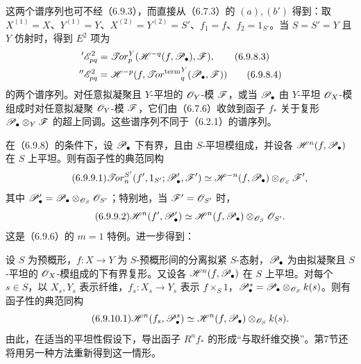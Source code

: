 这两个谱序列也可不经（6.9.3），而直接从（6.7.3）的 $(a),(b')$ 得到：取 $X^{(1)}=X$、$Y^{(1)}=Y$、$X^{(2)}=Y^{(2)}=S'$、$f_1=f$、$f_2=1_{S'}$。当 $S=S'=Y$ 且 $Y$ 仿射时，得到 $E^2$ 项为
\begin{align}
 {}'\mathscr E^2_{pq}&=\mathscr{T}\!or_p^Y(\mathscr H^{-q}(f,\mathscr P_\bullet),\mathscr F),\tag{6.9.8.3}\\
 {}''\mathscr E^2_{pq}&=\mathscr H^{-p}(f,\mathop{\mathscr{T}\!or^{\mathrm{term}}}\nolimits_q^Y(\mathscr P_\bullet,\mathscr F))\tag{6.9.8.4}
\end{align}
的两个谱序列。对任意拟凝聚且 $Y$-平坦的 $\mathscr O_Y$-模 $\mathscr F$，或当 $\mathscr P_\bullet$ 由 $Y$-平坦 $\mathscr O_X$-模组成时对任意拟凝聚 $\mathscr O_Y$-模 $\mathscr F$，它们由（6.7.6）收敛到函子 $f_*$ 关于复形 $\mathscr P_\bullet\otimes_Y\mathscr F$ 的超上同调。这些谱序列不同于（6.2.1）的谱序列。

在（6.9.8）的条件下，设 $\mathscr P_\bullet$ 下有界，且由 $S$-平坦模组成，并设各 $\mathscr H^n(f,\mathscr P_\bullet)$ 在 $S$ 上平坦。则有函子性的典范同构
\begin{equation}\tag{6.9.9.1}
 \mathscr{T}\!or_n^{S'}(f',1_{S'};\mathscr P'_\bullet,\mathscr F')
 \simeq\mathscr H^{-n}(f,\mathscr P_\bullet)\otimes_{\mathscr O_S}\mathscr F',
\end{equation}
其中 $\mathscr P'_\bullet=\mathscr P_\bullet\otimes_{\mathscr O_S}\mathscr O_{S'}$；特别地，当 $\mathscr F'=\mathscr O_{S'}$ 时，
\begin{equation}\tag{6.9.9.2}
 \mathscr H^n(f',\mathscr P'_\bullet)\simeq\mathscr H^n(f,\mathscr P_\bullet)\otimes_{\mathscr O_S}\mathscr O_{S'}.
\end{equation}
这是（6.9.6）的 $m=1$ 特例。进一步得到：

设 $S$ 为预概形，$f:X\to Y$ 为 $S$-预概形间的分离拟紧 $S$-态射，$\mathscr P_\bullet$ 为由拟凝聚且 $S$-平坦的 $\mathscr O_X$-模组成的下有界复形。又设各 $\mathscr H^n(f,\mathscr P_\bullet)$ 在 $S$ 上平坦。对每个 $s\in S$，以 $X_s,Y_s$ 表示纤维，$f_s:X_s\to Y_s$ 表示 $f\times_S1$，$\mathscr P^s_\bullet=\mathscr P_\bullet\otimes_{\mathscr O_S}k(s)$。则有函子性的典范同构
\begin{equation}\tag{6.9.10.1}
 \mathscr H^n(f_s,\mathscr P^s_\bullet)\simeq\mathscr H^n(f,\mathscr P_\bullet)\otimes_{\mathscr O_S}k(s).
\end{equation}
由此，在适当的平坦性假设下，导出函子 $R^nf_*$ 的形成“与取纤维交换”。第7节还将用另一种方法重新得到这一情形。
